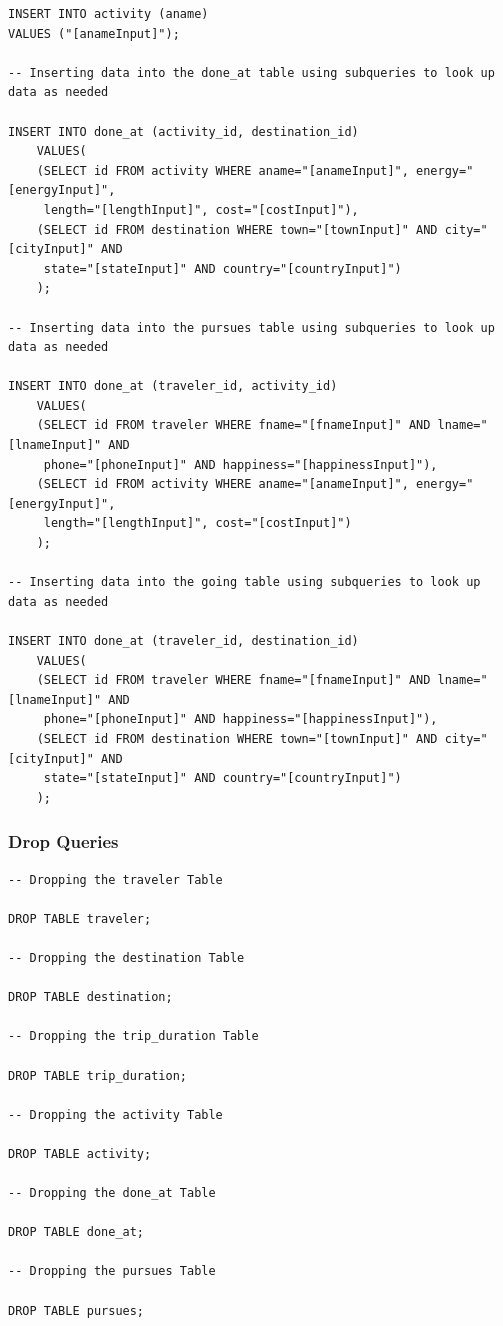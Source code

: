 \documentclass[letterpaper,10pt,onecolumn,compsoc]{IEEEtran}
\begin{document}
\newpage

\begin{verbatim}
INSERT INTO activity (aname) 
VALUES ("[anameInput]");

-- Inserting data into the done_at table using subqueries to look up data as needed

INSERT INTO done_at (activity_id, destination_id) 
	VALUES(
	(SELECT id FROM activity WHERE aname="[anameInput]", energy="[energyInput]", 
	 length="[lengthInput]", cost="[costInput]"), 
	(SELECT id FROM destination WHERE town="[townInput]" AND city="[cityInput]" AND 
	 state="[stateInput]" AND country="[countryInput]")
	);

-- Inserting data into the pursues table using subqueries to look up data as needed

INSERT INTO done_at (traveler_id, activity_id) 
	VALUES(
	(SELECT id FROM traveler WHERE fname="[fnameInput]" AND lname="[lnameInput]" AND 
	 phone="[phoneInput]" AND happiness="[happinessInput]"), 
	(SELECT id FROM activity WHERE aname="[anameInput]", energy="[energyInput]", 
	 length="[lengthInput]", cost="[costInput]")
	);

-- Inserting data into the going table using subqueries to look up data as needed

INSERT INTO done_at (traveler_id, destination_id) 
	VALUES(
	(SELECT id FROM traveler WHERE fname="[fnameInput]" AND lname="[lnameInput]" AND 
	 phone="[phoneInput]" AND happiness="[happinessInput]"), 
	(SELECT id FROM destination WHERE town="[townInput]" AND city="[cityInput]" AND 
	 state="[stateInput]" AND country="[countryInput]")
	);
\end{verbatim}

\subsubsection{Drop Queries}

\begin{verbatim}
-- Dropping the traveler Table

DROP TABLE traveler;

-- Dropping the destination Table

DROP TABLE destination;

-- Dropping the trip_duration Table

DROP TABLE trip_duration;

-- Dropping the activity Table

DROP TABLE activity;

-- Dropping the done_at Table

DROP TABLE done_at;

-- Dropping the pursues Table

DROP TABLE pursues;
\end{verbatim}
\end{document}

